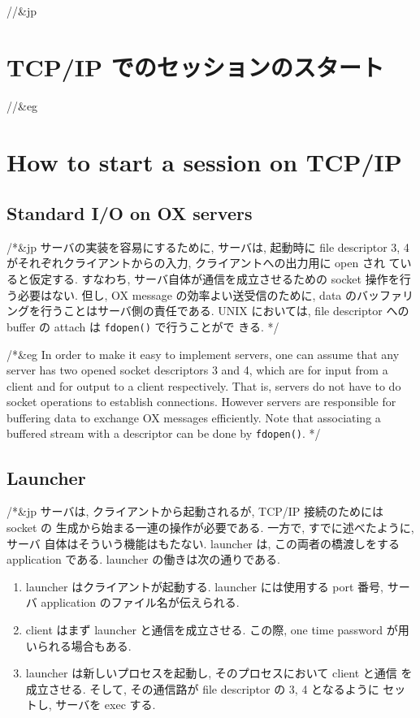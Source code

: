//&jp \section{TCP/IP でのセッションのスタート}
//&eg \section{How to start a session on TCP/IP}

\subsection{Standard I/O on OX servers}

/*&jp
サーバの実装を容易にするために, サーバは, 起動時に file descriptor 3,
4 がそれぞれクライアントからの入力, クライアントへの出力用に open され
ていると仮定する. すなわち, サーバ自体が通信を成立させるための socket 
操作を行う必要はない. 但し, OX message の効率よい送受信のために, data 
のバッファリングを行うことはサーバ側の責任である. UNIX においては,
file descriptor へのbuffer の attach は {\tt fdopen()} で行うことがで
きる.
*/

/*&eg
In order to make it easy to implement servers, one can assume that
any server has two opened socket descriptors 3 and 4,
which are for input from a client and for output to a client respectively.
That is, servers do not have to do socket operations to establish
connections. However servers are responsible for buffering data
to exchange OX messages efficiently. Note that associating a buffered stream
with a descriptor can be done by {\tt fdopen()}.
*/

\subsection{Launcher}
/*&jp
サーバは, クライアントから起動されるが, TCP/IP 接続のためには socket の
生成から始まる一連の操作が必要である. 一方で, すでに述べたように, サーバ
自体はそういう機能はもたない. launcher は, この両者の橋渡しをする application
である. launcher の働きは次の通りである. 

\begin{enumerate}
\item launcher はクライアントが起動する. launcher には使用する port 番号, 
サーバ application のファイル名が伝えられる. 
\item client はまず launcher と通信を成立させる. この際, one time password
が用いられる場合もある. 
\item launcher は新しいプロセスを起動し, そのプロセスにおいて client と通信
を成立させる. そして, その通信路が file descriptor の 3, 4 となるように
セットし, サーバを exec する. 
\end{enumerate}

